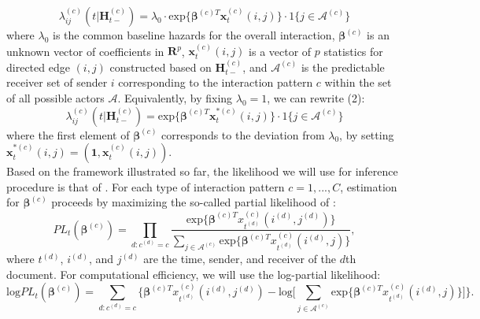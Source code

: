 \documentclass[a4paper]{article}
\begin{document}
\begin{equation}
\lambda^{(c)}_{ij}(t|\boldsymbol{H}^{(c)}_{t-})=\lambda_0\cdot \mbox{exp}\Big\{\boldsymbol{\beta}^{(c)T}\boldsymbol{x}^{(c)}_t(i, j)\Big\}\cdot 1\{j \in \mathcal{A}^{(c)}\}
\end{equation}
where $\lambda_0$ is the common baseline hazards for the overall interaction, $\boldsymbol{\beta}^{(c)}$ is an unknown vector of coefficients in $\boldsymbol{R}^{p}$, $\boldsymbol{x}^{(c)}_t(i, j)$ is a vector of $p$ statistics for directed edge $(i, j)$ constructed based on
$\boldsymbol{H}^{(c)}_{t-}$, and $\mathcal{A}^{(c)}$ is the predictable receiver set of sender $i$ corresponding to the interaction pattern $c$ within the set of all possible actors $\mathcal{A}$. Equivalently, by fixing $\lambda_0=1$, we can rewrite (2): 
\begin{equation}
\lambda^{(c)}_{ij}(t|\boldsymbol{H}^{(c)}_{t-})= \mbox{exp}\Big\{\boldsymbol{\beta}^{(c)T}\boldsymbol{x}^{*(c)}_t(i, j)\Big\}\cdot 1\{j \in \mathcal{A}^{(c)}\}
\end{equation}
where the first element of $\boldsymbol{\beta}^{(c)}$ corresponds to the deviation from $\lambda_0$, by setting $\boldsymbol{x}^{*(c)}_t(i, j)=(\boldsymbol{1}, \boldsymbol{x}^{(c)}_t(i, j))$.\\ \newline
Based on the framework illustrated so far, the likelihood we will use for inference procedure is that of  \cite{PerryWolfe2012}. For each type of interaction pattern $c=1,...,C$, estimation for $\boldsymbol{\beta}^{(c)}$ proceeds by maximizing the so-called partial likelihood of \cite{cox1992regression}: 
\begin{equation}
PL_t(\boldsymbol{\beta}^{(c)})=\prod_{d: c^{(d)}=c} \frac{\mbox{exp}\{\boldsymbol{\beta}^{(c)T}x^{(c)}_{t^{(d)}}(i^{(d)}, j^{(d)})\}}{\sum_{j\in \mathcal{A}^{(c)}} \mbox{exp}\{\boldsymbol{\beta}^{(c)T}x^{(c)}_{t^{(d)}}(i^{(d)}, j)\}},
\end{equation}
where $t^{(d)}$, $i^{(d)}$, and $j^{(d)}$ are the time, sender, and receiver
	of the $d$th document. For computational efficiency, we will use the log-partial likelihood:
\begin{equation}
\mbox{log}PL_t(\boldsymbol{\beta}^{(c)})=\sum_{d: c^{(d)}=c} \Big\{\boldsymbol{\beta}^{(c)T}x^{(c)}_{t^{(d)}}(i^{(d)}, j^{(d)})-\mbox{log}\big[\sum_{j\in \mathcal{A}^{(c)}}\mbox{exp}\{\boldsymbol{\beta}^{(c)T}x^{(c)}_{t^{(d)}}(i^{(d)}, j)\}\big]\Big\}.
\end{equation}
\end{document}
